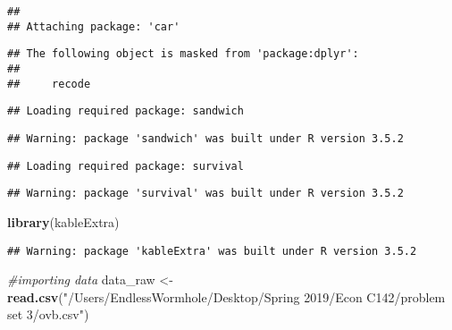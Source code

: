 \documentclass[]{article}
\newenvironment{Shaded}{\begin{snugshade}}{\end{snugshade}}
\newcommand{\CommentTok}[1]{\textcolor[rgb]{0.56,0.35,0.01}{\textit{#1}}}
\newcommand{\DecValTok}[1]{\textcolor[rgb]{0.00,0.00,0.81}{#1}}
\newcommand{\KeywordTok}[1]{\textcolor[rgb]{0.13,0.29,0.53}{\textbf{#1}}}
\newcommand{\NormalTok}[1]{#1}
\newcommand{\OperatorTok}[1]{\textcolor[rgb]{0.81,0.36,0.00}{\textbf{#1}}}
\newcommand{\StringTok}[1]{\textcolor[rgb]{0.31,0.60,0.02}{#1}}
\begin{document}
\begin{verbatim}
## 
## Attaching package: 'car'
\end{verbatim}

\begin{verbatim}
## The following object is masked from 'package:dplyr':
## 
##     recode
\end{verbatim}

\begin{verbatim}
## Loading required package: sandwich
\end{verbatim}

\begin{verbatim}
## Warning: package 'sandwich' was built under R version 3.5.2
\end{verbatim}

\begin{verbatim}
## Loading required package: survival
\end{verbatim}

\begin{verbatim}
## Warning: package 'survival' was built under R version 3.5.2
\end{verbatim}

\begin{Shaded}
\begin{Highlighting}[]
\KeywordTok{library}\NormalTok{(kableExtra)}
\end{Highlighting}
\end{Shaded}

\begin{verbatim}
## Warning: package 'kableExtra' was built under R version 3.5.2
\end{verbatim}

\begin{Shaded}
\begin{Highlighting}[]
\CommentTok{#importing data}
\NormalTok{data_raw <-}\StringTok{ }\KeywordTok{read.csv}\NormalTok{(}\StringTok{"/Users/EndlessWormhole/Desktop/Spring 2019/Econ C142/problem set 3/ovb.csv"}\NormalTok{)}
\end{Highlighting}
\end{Shaded}

\begin{Shaded}
\end{Shaded}
\end{document}
